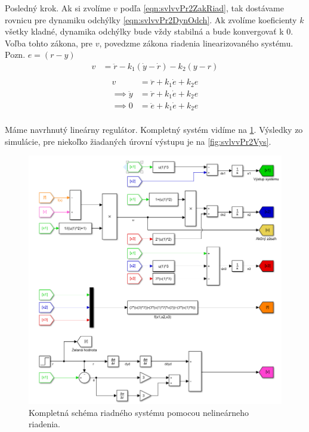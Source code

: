 \documentclass[../main.tex]{subfiles}
\begin{document}
	Posledný krok. Ak si zvolíme $v$ podľa \cref{eqn:svlvvPr2ZakRiad}, tak dostávame rovnicu pre dynamiku odchýlky \cref{eqn:svlvvPr2DynOdch}. Ak zvolíme koeficienty $k$ všetky kladné, dynamika odchýlky bude vždy stabilná a bude konvergovať k 0. Voľba tohto zákona, pre $v$, povedzme zákona riadenia linearizovaného systému. Pozn. $e = (r - y)$
	\begin{equation}
	\begin{aligned}
	v &= \ddot{r} - k_1 (\dot{y} - \dot{r}) - k_2(y-r)\\
	\end{aligned}
	\label{eqn:svlvvPr2ZakRiad}
	\end{equation}
	\begin{equation}
	\begin{aligned}
	v &= \ddot{r}  +k_1 \dot{e} + k_2 e \\
	\implies \ddot{y} &= \ddot{r}  +k_1 \dot{e} + k_2 e \\
	\implies 0 &= \ddot{e}  + k_1 \dot{e} + k_2 e \\	 
	\end{aligned}
	\label{eqn:svlvvPr2DynOdch}
	\end{equation}
	
	Máme navrhnutý lineárny regulátor. Kompletný systém vidíme na \cref{fig:svlvvPr2All}.  Výsledky zo simulácie, pre niekoľko žiadaných úrovní výstupu je na \cref{fig:svlvvPr2Vys}.
	\begin{figure}[h!]
		\centering
		\includegraphics[width=\linewidth]{sysPr2complet}
		\caption{Kompletná schéma riadného systému pomocou nelineárneho riadenia.}
		\label{fig:svlvvPr2All}
	\end{figure}
\end{document}
